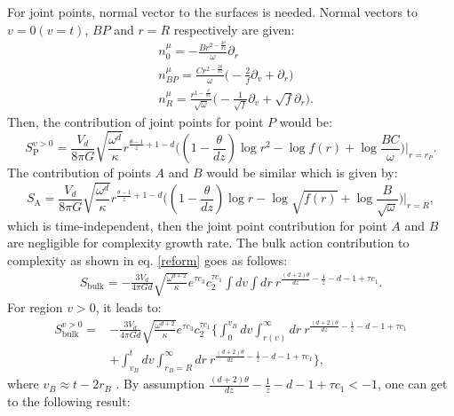 \documentclass[]{article}
\begin{document}
For joint points, normal vector to the surfaces is needed. Normal vectors to $v=0 (v=t)$, $BP$ and $r=R$ respectively are given:
\begin{align}
&n_0^{\mu}=-\frac{B r^{2-\frac{2\theta}{dz}}}{\omega}\partial_r\\
&n_{BP}^{\mu}=\frac{C r^{2-\frac{2\theta}{dz}}}{\omega}\Big(-\frac{2}{f}\partial_v+\partial_r\Big)\\
&n_R^{\mu}=\frac{r^{1-\frac{\theta}{dz}}}{\sqrt{\omega}}\Big(-\frac{1}{\sqrt{f}}\partial_v+\sqrt{f}\partial_r\Big).
\end{align}
Then, the contribution of joint points for point $P$ would be:
\begin{equation}
S^{v>0}_{\text{P}}=\frac{V_d}{8\pi G}\sqrt{\frac{\omega^d}{\kappa}}r^{\frac{\theta-1}{z}+1-d}\bigg((1-\frac{\theta}{dz}) \log r^2 -\log f(r) +\log \frac{BC}{\omega}\bigg)\Big|_{r=r_P}.
\end{equation}
The contribution of points $A$ and $B$ would be similar which is given by:
\begin{equation}
S_{\text{A}}=\frac{V_d}{8\pi G}\sqrt{\frac{\omega^d}{\kappa}}r^{\frac{\theta-1}{z}+1-d}\bigg((1-\frac{\theta}{dz}) \log r -\log \sqrt{f(r)} +\log \frac{B}{\sqrt{\omega}}\bigg)\Big|_{r=R},
\end{equation}
which is time-independent, then the joint point contribution for point $A$ and $B$ are negligible for complexity growth rate. 
The bulk action contribution to complexity as shown in eq. \eqref{reform} goes as follows:
\begin{align}
S_{\text{bulk}}=-\frac{3V_d}{4\pi Gd}\sqrt{\frac{\omega^{d+2}}{\kappa}} e^{\tau c_3} c_2^{\tau c_1} \int dv \int dr~ r^{\frac{(d+2)\theta}{dz}-\frac{1}{z}-d-1+\tau c_1}.
\end{align}
For region $v>0$, it leads to:
\begin{equation}
\begin{aligned}
S^{v>0}_{\text{bulk}}=&-\frac{3V_d}{4\pi Gd}\sqrt{\frac{\omega^{d+2}}{\kappa}} e^{\tau c_3} c_2^{\tau c_1}\Big\{ \int_0^{v_B} dv \int_{r(v)}^{\infty} dr ~r^{\frac{(d+2)\theta}{dz}-\frac{1}{z}-d-1+\tau c_1}\\
&+\int_{v_B}^t dv \int_{r_B=R}^{\infty} dr ~r^{\frac{(d+2)\theta}{dz}-\frac{1}{z}-d-1+\tau c_1}\Big\},
\end{aligned}
\end{equation}
where $v_B\approx t-2r_B$ . By assumption $\frac{(d+2)\theta}{dz}-\frac{1}{z}-d-1+\tau c_1<-1$, one can get to the following result:
\end{document}
